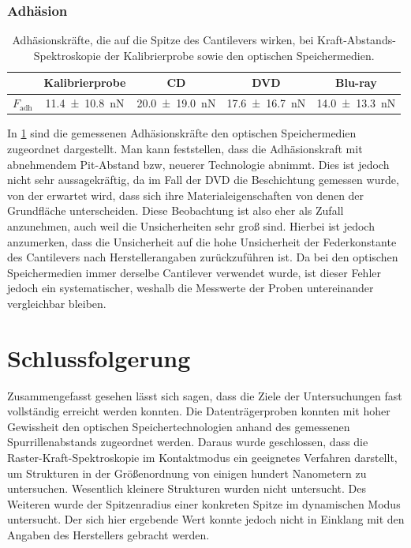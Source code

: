 \documentclass[
	a4paper,
	12pt,
	pagesize,
	ngerman
]{scrartcl}
\begin{document}
	\subsubsection{Adhäsion}

	\begin{table}[H]
		\centering
		\begin{tabular}{ c | c | c| c | c }
			 & Kalibrierprobe & CD & DVD & Blu-ray\\ \hline
			$F_\text{adh}$ & \SI{11.4+-10.8}{nN} & \SI{20,0+-19,0}{\nano \newton}& \SI{17,6 +- 16,7}{\nano \newton}& \SI{14,0+-13,3}{\nano \newton} \\
		\end{tabular}
		\caption{Adhäsionskräfte, die auf die Spitze des Cantilevers wirken, bei Kraft-Abstands-Spektroskopie der Kalibrierprobe sowie den optischen Speichermedien.}
		\label{tb_diskus_adhaesion}
	\end{table}

	In \cref{tb_diskus_adhaesion} sind die gemessenen Adhäsionskräfte den optischen Speichermedien zugeordnet dargestellt.
	Man kann feststellen, dass die Adhäsionskraft mit abnehmendem Pit-Abstand bzw, neuerer Technologie abnimmt.
	Dies ist jedoch nicht sehr aussagekräftig, da im Fall der DVD die Beschichtung gemessen wurde, von der erwartet wird, dass sich ihre Materialeigenschaften von denen der Grundfläche unterscheiden.
	Diese Beobachtung ist also eher als Zufall anzunehmen, auch weil die Unsicherheiten sehr groß sind.
	Hierbei ist jedoch anzumerken, dass die Unsicherheit auf die hohe Unsicherheit der Federkonstante des Cantilevers nach Herstellerangaben zurückzuführen ist.
	Da bei den optischen Speichermedien immer derselbe Cantilever verwendet wurde, ist dieser Fehler jedoch ein systematischer, weshalb die Messwerte der Proben untereinander vergleichbar bleiben.

	\section{Schlussfolgerung}
	Zusammengefasst gesehen lässt sich sagen, dass die Ziele der Untersuchungen fast vollständig erreicht werden konnten.
	Die Datenträgerproben konnten mit hoher Gewissheit den optischen Speichertechnologien anhand des gemessenen Spurrillenabstands zugeordnet werden.
	Daraus wurde geschlossen, dass die Raster-Kraft-Spektroskopie im Kontaktmodus ein geeignetes Verfahren darstellt, um Strukturen in der Größenordnung von einigen hundert Nanometern zu untersuchen.
	Wesentlich kleinere Strukturen wurden nicht untersucht.
	Des Weiteren wurde der Spitzenradius einer konkreten Spitze im dynamischen Modus untersucht.
	Der sich hier ergebende Wert konnte jedoch nicht in Einklang mit den Angaben des Herstellers gebracht werden.
\end{document}
